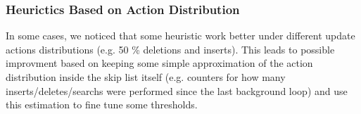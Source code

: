\documentclass{article}
\begin{document}
\subsubsection{Heurictics Based on Action Distribution}
\label{sssec:fr-1}
In some cases, we noticed that some heuristic work better under different update actions distributions (e.g. 50 \% deletions and inserts). This leads to possible improvment based on keeping some simple approximation of the action distribution inside the skip list itself (e.g. counters for how many inserts/deletes/searchs were performed since the last background loop) and use this estimation to fine tune some thresholds.






\end{document}
